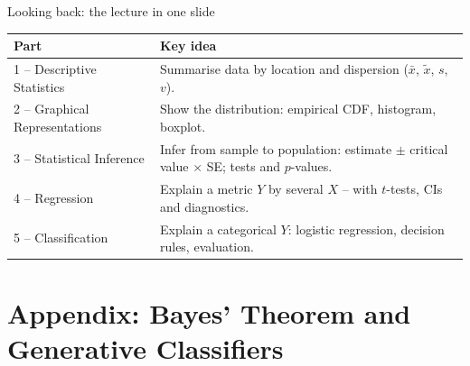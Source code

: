 \documentclass[aspectratio=169,11pt]{beamer}
\newcommand{\overviewleft}{1-4}
\begin{document}
\begin{frame}{Looking back: the lecture in one slide}
  \begin{center}
    \small\renewcommand{\arraystretch}{1.22}
    \begin{tabular}{@{}l>{\raggedright\arraybackslash}p{9.6cm}@{}}
      \toprule
      \textbf{Part} & \textbf{Key idea}\\
      \midrule
      1 -- Descriptive Statistics & Summarise data by location and dispersion ($\bar x$, $\tilde x$, $s$, $v$).\\
      2 -- Graphical Representations & Show the distribution: empirical CDF, histogram, boxplot.\\
      3 -- Statistical Inference & Infer from sample to population: estimate $\pm$ critical value $\times$ SE; tests and $p$-values.\\
      4 -- Regression & Explain a metric $Y$ by several $X$ -- with $t$-tests, CIs and diagnostics.\\
      5 -- Classification & Explain a categorical $Y$: logistic regression, decision rules, evaluation.\\
      \bottomrule
    \end{tabular}
  \end{center}
\end{frame}


\appendix
\let\overviewleft\undefined
\section[Appendix]{Appendix: Bayes' Theorem and Generative Classifiers}
\end{document}

